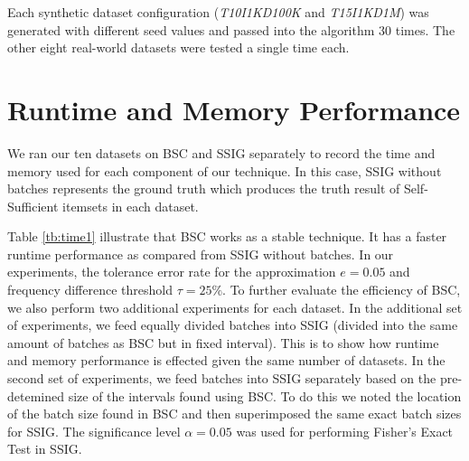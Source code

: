 Each synthetic dataset configuration (\textit{T10I1KD100K} and \textit{T15I1KD1M}) was generated with different seed values and passed into the algorithm 30 times. The other eight real-world datasets were tested a single time each.

\section {Runtime and Memory Performance}
We ran our ten datasets on BSC and SSIG separately to record the time and memory used for each component of our technique. In this case, SSIG without batches represents the ground truth which produces the truth result of Self-Sufficient itemsets in each dataset.

Table \ref{tb:time1} %
illustrate that BSC works as a stable technique. It has a faster runtime performance as compared from SSIG without batches. In our experiments, the tolerance error rate for the approximation $e=0.05$ and frequency difference threshold $\tau=25\%$.
To further evaluate the efficiency of BSC, we also perform two additional experiments for each dataset. In the additional set of experiments, we feed equally divided batches into SSIG (divided into the same amount of batches as BSC but in fixed interval). This is to show how runtime and memory performance is effected given the same number of datasets. In the second set of experiments, we feed batches into SSIG separately based on the pre-detemined size of the  intervals found using BSC. To do this we noted the location of the batch size found in BSC and then superimposed the same exact batch sizes for SSIG. The significance level $\alpha=0.05$ was used for performing Fisher's Exact Test in SSIG.

